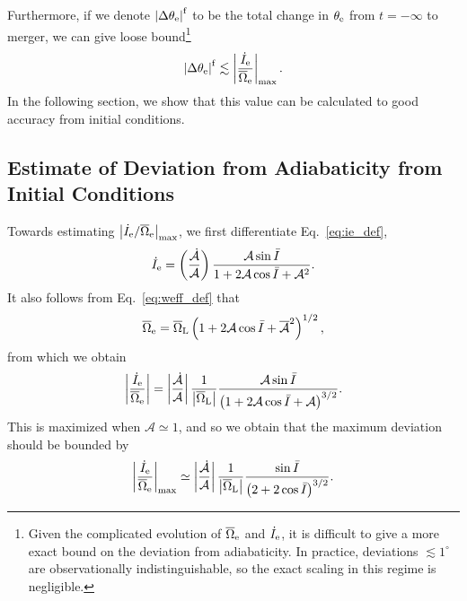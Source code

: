 \documentclass[
        twocolumn,
        twocolappendix
    ]{aastex63}
\newcommand*{\abs}[1]{\left|#1\right|}
\newcommand*{\p}[1]{\left(#1\right)}
\begin{document}
Furthermore, if we denote $\abs{\Delta \theta_{\rm e}}^{\rm f}$ to be the total change
in $\theta_{\rm e}$ from $t = -\infty$ to merger, we can give loose
bound\footnote{Given the complicated evolution of $\overline{\Omega}_{\rm e}$
and $\dot{I}_{\rm e}$, it is difficult to give a more exact bound on the
deviation from adiabaticity. In practice, deviations $\lesssim 1^\circ$ are
observationally indistinguishable, so the exact scaling in this regime is
negligible.}
\begin{equation}
    \abs{\Delta \theta_{\rm e}}^{\rm f} \lesssim
        \abs{\frac{\dot{I}_{\rm e}}{\overline{\Omega}_{\rm e}}}_{\max}.
        \label{eq:nonad_dqeff_tot}
\end{equation}
In the following section, we show that this value can be calculated to good
accuracy from initial conditions.

\subsection{Estimate of Deviation from Adiabaticity from Initial Conditions}

Towards estimating $\abs{\dot{I}_{\rm e} / \overline{\Omega}_{\rm e}}_{\max}$, we
first differentiate Eq.~\eqref{eq:ie_def},
\begin{equation}
    \dot{I}_{\rm e} = \p{\frac{\dot{\mathcal{A}}}{
            \mathcal{A}}}
        \frac{\mathcal{A} \sin \bar{I}}{
            1 + 2\mathcal{A}\cos \bar{I}
                + \mathcal{A}^2}.
\end{equation}
It also follows from Eq.~\eqref{eq:weff_def} that
\begin{equation}
    \overline{\Omega}_{\rm e} = \overline{\Omega}_{\rm L}
        \p{1 + 2\mathcal{A}\cos \bar{I}
            + \overline{\mathcal{A}}^2}^{1/2},
\end{equation}
from which we obtain
\begin{equation}
    \abs{\frac{\dot{I}_{\rm e}}{\overline{\Omega}_{\rm e}}}
        = \abs{\frac{\dot{\mathcal{A}}}{
            \mathcal{A}}}
        \frac{1}{\abs{\overline{\Omega}_{\rm L}}}
        \frac{\mathcal{A} \sin \bar{I}}{
            \p{1 + 2\mathcal{A}\cos \bar{I}
                + \mathcal{A}}^{3/2}}.
\end{equation}
This is maximized when $\mathcal{A} \simeq 1$, and so we obtain that
the maximum deviation should be bounded by
\begin{equation}
    \abs{\frac{\dot{I}_{\rm e}}{\overline{\Omega}_{\rm e}}}_{\max}
        \simeq \abs{\frac{\dot{\mathcal{A}}}{\mathcal{A}}}
            \frac{1}{\abs{\overline{\Omega}_{\rm L}}}
            \frac{\sin \bar{I}}{\p{2 + 2\cos \bar{I}}^{3/2}}.
            \label{eq:idot_over_W}
\end{equation}
\end{document}
